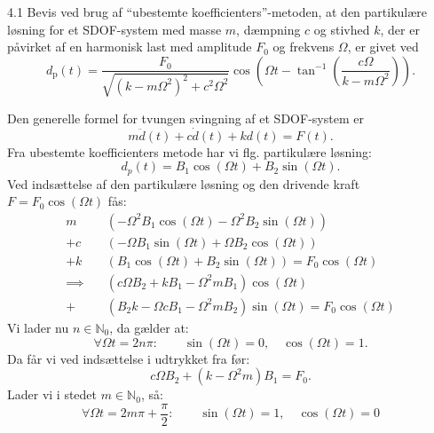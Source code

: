 
\begin{problem}{4.1}
  Bevis ved brug af ``ubestemte koefficienters''-metoden, at den partikulære løsning for et SDOF-system med masse $m$, dæmpning $c$ og stivhed $k$, der er påvirket af en harmonisk last med amplitude $F_0$ og frekvens $\Omega$, er givet ved
  \[ 
  d_{\mathrm{p}}(t) = \frac{F_0}{\sqrt{\left( k - m \Omega^2 \right)^2 + c^2 \Omega^2}} \cos \left( \Omega t - \tan^{-1} \left( \frac{c\Omega}{k - m\Omega^2} \right) \right)
  .\]
\end{problem}

\begin{derivation}
  Den generelle formel for tvungen svingning af et SDOF-system er
  \[ 
  m \ddot{d}(t) + c \dot{d}(t) + kd (t) = F (t) 
  .\]
  Fra ubestemte koefficienters metode har vi flg. partikulære løsning:
  \[ 
  d_p (t) = B_1 \cos \left( \Omega t \right) + B_2 \sin \left( \Omega t \right)
  .\]
  Ved indsættelse af den partikulære løsning og den drivende kraft $F = F_0 \cos \left( \Omega t \right)$ fås:
  \begin{align*}
    m &\left( - \Omega^2 B_1 \cos \left( \Omega t \right) - \Omega^2 B_2 \sin \left( \Omega t \right) \right) \\
    + c &\left( - \Omega B_1 \sin \left( \Omega t \right) + \Omega B_2 \cos \left( \Omega t \right) \right) \\
    + k &\left( B_1 \cos \left( \Omega t \right) + B_2 \sin \left( \Omega t \right) \right) = F_0 \cos \left( \Omega t \right) \\
    \implies \quad &\left( c \Omega B_2 + k B_1 - \Omega^2 m B_1 \right) \cos \left( \Omega t \right) \\
    + &\left( B_2 k - \Omega c B_1 - \Omega^2 m B_2 \right) \sin \left( \Omega t \right) = F_0 \cos \left( \Omega t \right)
  \end{align*}
  Vi lader nu $n \in \mathbb{N}_0$, da gælder at:
  \[ 
  \forall \Omega t = 2n \pi: \qquad \sin \left( \Omega t \right) = 0, \quad \cos \left( \Omega t \right) = 1
  .\]
  Da får vi ved indsættelse i udtrykket fra før:
  \begin{equation} \label{eq:41a}
    c \Omega B_2 + \left( k - \Omega^2 m \right) B_1 = F_0
  .\end{equation}
  Lader vi i stedet $m \in \mathbb{N}_0$, så:
  \[ 
  \forall \Omega t = 2m \pi + \frac{\pi}{2}: \qquad \sin \left( \Omega t \right) = 1, \quad \cos \left( \Omega t \right) = 0
\]
\end{derivation}
